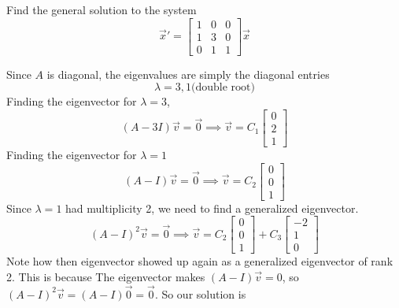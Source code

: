 \begin{example}
	Find the general solution to the system
	\begin{equation*}
		\vec{x}' = \begin{bmatrix}
			1 & 0 & 0 \\
			1 & 3 & 0 \\
			0 & 1 & 1
		\end{bmatrix} \vec{x}
	\end{equation*}
\end{example}
\noindent
Since $A$ is diagonal, the eigenvalues are simply the diagonal entries
\begin{equation*}
	\lambda = 3, 1 \text{(double root)}
\end{equation*}
Finding the eigenvector for $\lambda  = 3$,
\begin{equation*}
	(A - 3I)\vec{v} = \vec{0} \implies \vec{v} = C_1 \begin{bmatrix}
		0 \\
		2 \\
		1
	\end{bmatrix}
\end{equation*}
Finding the eigenvector for $\lambda = 1$
\begin{equation*}
	(A - I)\vec{v} = \vec{0} \implies \vec{v} = C_2 \begin{bmatrix}
		0 \\
		0 \\
		1
	\end{bmatrix}
\end{equation*}
Since $\lambda  =1$ had multiplicity 2, we need to find a generalized eigenvector.
\begin{equation*}
	(A - I)^2\vec{v} = \vec{0} \implies \vec{v} = C_2 \begin{bmatrix}
		0 \\
		0 \\
		1
	\end{bmatrix} + C_3 \begin{bmatrix}
		-2 \\
		1 \\
		0
	\end{bmatrix}
\end{equation*}
Note how then eigenvector showed up again as a generalized eigenvector of rank 2. This is because The eigenvector makes $(A - I)\vec{v} = 0$, so $(A - I)^2\vec{v} = (A - I)\vec{0} = \vec{0}$.
So our solution is
